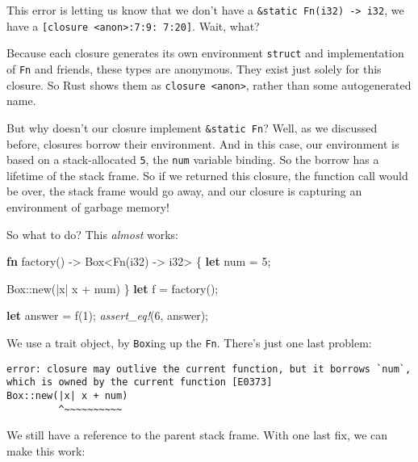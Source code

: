 \documentclass[a4paper,]{book}
\newenvironment{Shaded}{\begin{snugshade}}{\end{snugshade}}
\newcommand{\KeywordTok}[1]{\textcolor[rgb]{0.13,0.29,0.53}{\textbf{{#1}}}}
\newcommand{\DataTypeTok}[1]{\textcolor[rgb]{0.13,0.29,0.53}{{#1}}}
\newcommand{\DecValTok}[1]{\textcolor[rgb]{0.00,0.00,0.81}{{#1}}}
\newcommand{\BuiltInTok}[1]{{#1}}
\newcommand{\PreprocessorTok}[1]{\textcolor[rgb]{0.56,0.35,0.01}{\textit{{#1}}}}
\newcommand{\NormalTok}[1]{{#1}}
\begin{document}
This error is letting us know that we don't have a
\texttt{\&\textquotesingle{}static\ Fn(i32)\ -\textgreater{}\ i32}, we
have a \texttt{{[}closure\ \textless{}anon\textgreater{}:7:9:\ 7:20{]}}.
Wait, what?

Because each closure generates its own environment \texttt{struct} and
implementation of \texttt{Fn} and friends, these types are anonymous.
They exist just solely for this closure. So Rust shows them as
\texttt{closure\ \textless{}anon\textgreater{}}, rather than some
autogenerated name.

But why doesn't our closure implement
\texttt{\&\textquotesingle{}static\ Fn}? Well, as we discussed before,
closures borrow their environment. And in this case, our environment is
based on a stack-allocated \texttt{5}, the \texttt{num} variable
binding. So the borrow has a lifetime of the stack frame. So if we
returned this closure, the function call would be over, the stack frame
would go away, and our closure is capturing an environment of garbage
memory!

So what to do? This \emph{almost} works:

\begin{Shaded}
\begin{Highlighting}[]
\KeywordTok{fn} \NormalTok{factory() -> }\DataTypeTok{Box}\NormalTok{<}\BuiltInTok{Fn}\NormalTok{(}\DataTypeTok{i32}\NormalTok{) -> }\DataTypeTok{i32}\NormalTok{> \{}
    \KeywordTok{let} \NormalTok{num = }\DecValTok{5}\NormalTok{;}

    \DataTypeTok{Box}\NormalTok{::new(|x| x + num)}
\NormalTok{\}}
\KeywordTok{let} \NormalTok{f = factory();}

\KeywordTok{let} \NormalTok{answer = f(}\DecValTok{1}\NormalTok{);}
\PreprocessorTok{assert_eq!}\NormalTok{(}\DecValTok{6}\NormalTok{, answer);}
\end{Highlighting}
\end{Shaded}

We use a trait object, by \texttt{Box}ing up the \texttt{Fn}. There's
just one last problem:

\begin{verbatim}
error: closure may outlive the current function, but it borrows `num`,
which is owned by the current function [E0373]
Box::new(|x| x + num)
         ^~~~~~~~~~~
\end{verbatim}

We still have a reference to the parent stack frame. With one last fix,
we can make this work:
\end{document}
